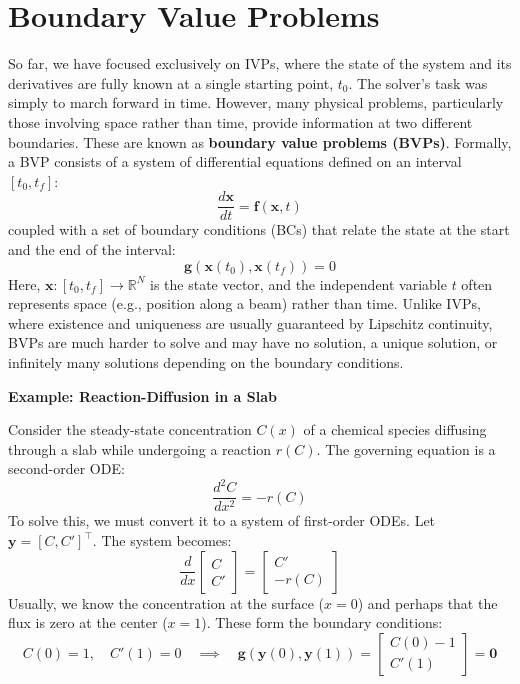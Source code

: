 
\chapter{Boundary Value Problems}

So far, we have focused exclusively on IVPs, where the state of the system and its derivatives are fully known at a single starting point, $t_0$. The solver's task was simply to march forward in time. However, many physical problems, particularly those involving space rather than time, provide information at two different boundaries. These are known as \textbf{boundary value problems (BVPs)}. Formally, a BVP consists of a system of differential equations defined on an interval $[t_0, t_f]$:
\begin{equation}
    \frac{d\mathbf{x}}{dt} = \mathbf{f}(\mathbf{x}, t)
\end{equation}
coupled with a set of boundary conditions (BCs) that relate the state at the start and the end of the interval:
\begin{equation}
    \mathbf{g}(\mathbf{x}(t_0), \mathbf{x}(t_f)) = 0
\end{equation}
Here, $\mathbf{x}: [t_0, t_f] \to \mathbb{R}^N$ is the state vector, and the independent variable $t$ often represents space (e.g., position along a beam) rather than time. Unlike IVPs, where existence and uniqueness are usually guaranteed by Lipschitz continuity, BVPs are much harder to solve and may have no solution, a unique solution, or infinitely many solutions depending on the boundary conditions.

\begin{exampleBox}
    \textbf{Example: Reaction-Diffusion in a Slab}
    
    Consider the steady-state concentration $C(x)$ of a chemical species diffusing through a slab while undergoing a reaction $r(C)$. The governing equation is a second-order ODE:
    \begin{equation}
        \frac{d^2C}{dx^2} = -r(C)
    \end{equation}
    To solve this, we must convert it to a system of first-order ODEs. Let $\mathbf{y} = [C, C']^\top$. The system becomes:
    \begin{equation}
        \frac{d}{dx} \begin{bmatrix} C \\ C' \end{bmatrix} = \begin{bmatrix} C' \\ -r(C) \end{bmatrix}
    \end{equation}
    Usually, we know the concentration at the surface ($x=0$) and perhaps that the flux is zero at the center ($x=1$). These form the boundary conditions:
    \begin{equation}
        C(0) = 1, \quad C'(1) = 0 \quad \implies \quad \mathbf{g}(\mathbf{y}(0), \mathbf{y}(1)) = \begin{bmatrix} C(0) - 1 \\ C'(1) \end{bmatrix} = \mathbf{0}
    \end{equation}
\end{exampleBox}

